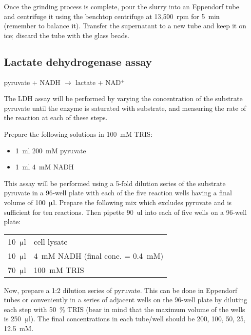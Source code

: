 \documentclass[a4paper]{article}
\newcommand{\micro}{$\muup$}
\begin{document}
\begin{multicols}{2}
Once the grinding process is complete, pour the slurry into an Eppendorf tube
and centrifuge it using the benchtop centrifuge at 13,500~rpm for 5~min
(remember to balance it). Transfer the supernatant to a new tube and keep it on
ice; discard the tube with the glass beads.

\subsection{Lactate dehydrogenase assay}

pyruvate + NADH $\rightarrow$ lactate + NAD$^+$

The LDH assay will be performed by varying the concentration of the substrate
pyruvate until the enzyme is saturated with substrate, and measuring the rate
of the reaction at each of these steps.

Prepare the following solutions in 100~mM TRIS:

\begin{itemize}
\item 1~ml 200~mM pyruvate
\item 1~ml 4~mM NADH 
\end{itemize}

This assay will be performed using a 5-fold dilution series of the substrate
pyruvate in a 96-well plate with each of the five reaction wells having a final
volume of 100~\micro l. Prepare the following mix which excludes pyruvate and
is sufficient for ten reactions. Then pipette 90~ul into each of five wells on
a 96-well plate:

\begin{center}
\begin{tabular}[h]{rl} \toprule
10~\micro l & cell lysate\\ 
10~\micro l & 4~mM NADH (final conc. = 0.4~mM)\\ 
70~\micro l & 100~mM TRIS\\ \bottomrule
\end{tabular}
\end{center}

Now, prepare a 1:2 dilution series of pyruvate. This can be done in Eppendorf
tubes or conveniently in a series of adjacent wells on the 96-well plate by
diluting each step with 50~\% TRIS (bear in mind that the maximum volume of the
wells is 250~\micro l). The final concentrations in each tube/well should be
200, 100, 50, 25, 12.5~mM.


\end{multicols}
\end{document}
